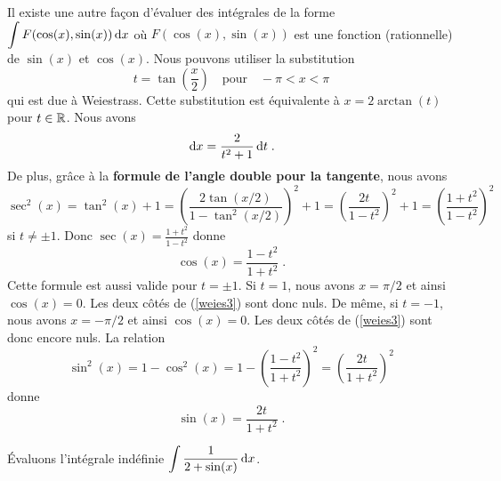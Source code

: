 {Il existe une autre façon d'évaluer des intégrales de la forme
$\displaystyle \int F(\cos(x), \sin(x)) \,\mathrm{d}x$ où
$F(\cos(x), \sin(x))$ est 
une fonction (rationnelle) de $\sin(x)$ et $\cos(x)$.  Nous pouvons
utiliser la substitution
\begin{equation} \label{weies1}
t = \tan\left(\frac{x}{2}\right) \quad \text{pour} \quad -\pi < x < \pi
\end{equation}
qui est due à Weiestrass.  Cette substitution est équivalente à
$x = 2 \arctan(t)$ pour $t\in \mathbb{R}$.  Nous avons
\begin{equation} \label{weies2}
\,\mathrm{d}x = \frac{2}{t^2+1} \,\mathrm{d}t \; .
\end{equation}
De plus, grâce à la
{\bfseries formule de l'angle double pour la tangente}, nous avons
\[
\sec^2(x) = \tan^2(x) + 1 = \left(\frac{2\tan(x/2)}
{1-\tan^2(x/2)}\right)^2 + 1
= \left(\frac{2t}{1-t^2}\right)^2 + 1 = \left(\frac{1+t^2}{1-t^2}\right)^2
\]
si $t\neq \pm 1$.  Donc $\displaystyle \sec(x) = \frac{1+t^2}{1-t^2}$
donne
\begin{equation} \label{weies3}
\cos(x) = \frac{1-t^2}{1+t^2}  \; .
\end{equation}
Cette formule est aussi valide pour $t = \pm 1$.  Si $t=1$, nous avons
$x = \pi/2$ et ainsi $\cos(x) = 0$.  Les deux côtés de
(\ref{weies3}) sont donc nuls.  De même, si $t= -1$, nous avons $x = -\pi/2$ et
ainsi $\cos(x) = 0$.  Les deux côtés de (\ref{weies3}) sont donc
encore nuls.  La relation
\[
\sin^2(x) = 1 - \cos^2(x) = 1 - \left(\frac{1-t^2}{1+t^2}\right)^2
= \left(\frac{2t}{1+t^2}\right)^2
\]
donne
\begin{equation} \label{weies4}
\sin(x) = \frac{2t}{1+t^2} \; .
\end{equation}

\begin{egg}
Évaluons l'intégrale indéfinie
$\displaystyle \int \frac{1}{2+\sin(x)} \,\mathrm{d}x$.


\end{egg}}
